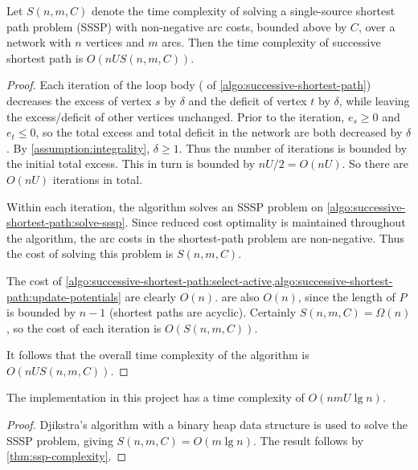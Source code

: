 \begin{thm} \label{thm:ssp-complexity}
Let $S(n,m,C)$ denote the time complexity of solving a single-source shortest path problem (SSSP) with non-negative arc costs, bounded above by $C$, over a network with $n$ vertices and $m$ arcs. Then the time complexity of successive shortest path is $O(nUS(n,m,C))$.
\end{thm}
\begin{proof}
Each iteration of the loop body ( of \cref{algo:successive-shortest-path}) decreases the excess of vertex $s$ by $\delta$ and the deficit of vertex $t$ by $\delta$, while leaving the excess/deficit of other vertices unchanged. Prior to the iteration, $e_s \geq 0$ and $e_t \leq 0$, so the total excess and total deficit in the network are both decreased by $\delta$. By \cref{assumption:integrality}, $\delta \geq 1$. Thus the number of iterations is bounded by the initial total excess. This in turn is bounded by $nU/2 = O(nU)$. So there are $O(nU)$ iterations in total.

Within each iteration, the algorithm solves an SSSP problem on \cref{algo:successive-shortest-path:solve-sssp}. Since reduced cost optimality is maintained throughout the algorithm, the arc costs in the shortest-path problem are non-negative\footnotemark. Thus the cost of solving this problem is $S(n,m,C)$.

The cost of \cref{algo:successive-shortest-path:select-active,algo:successive-shortest-path:update-potentials} are clearly $O(n)$.  are also $O(n)$, since the length of $P$ is bounded by $n-1$ (shortest paths are acyclic). Certainly $S(n,m,C) = \Omega(n)$, so the cost of each iteration is $O(S(n,m,C))$.

It follows that the overall time complexity of the algorithm is $O(nUS(n,m,C))$.
\end{proof}

\begin{cor}
The implementation in this project has a time complexity of $O(nmU \lg n)$.
\end{cor}
\begin{proof}
Djikstra's algorithm with a binary heap data structure is used to solve the SSSP problem, giving $S(n,m,C) = O(m \lg n)$. The result follows by \cref{thm:ssp-complexity}.
\end{proof}

